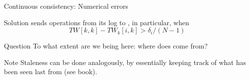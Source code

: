 \begin{slide}{Continuous consistency: Numerical errors}
  \begin{block}{Solution} 
     sends operations from its log to  , in particular, when \[TW[k,k] - TW_k[i,k] > \delta_i/(N-1)\]
  \end{block}
  \begin{block}{Question}
    To what extent are we being  here: where does  come from?
  \end{block}
  \begin{alertblock}{Note}
    Staleness can be done analogously, by essentially keeping track of what has been seen last from  (see
    book).
  \end{alertblock}
\end{slide}
